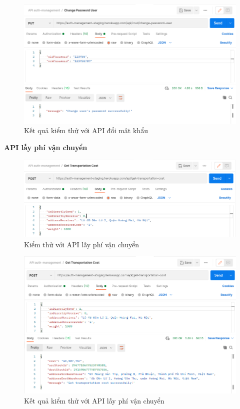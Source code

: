 		\begin{figure}[H]
			\includegraphics[width=1\textwidth]{Images/testing/API-change-password-result.png}
			\centering
			\linebreak
			\caption{Kết quả kiểm thử với API đổi mât khẩu}
		\end{figure}
		
		\newpage
		\textbf{API lấy phí vận chuyển}
		
		\begin{figure}[H]
			\includegraphics[width=1\textwidth]{Images/testing/API-get-cost.png}
			\centering
			\linebreak
			\caption{Kiểm thử với API lấy phí vận chuyển}
		\end{figure}
		
		\begin{figure}[H]
			\includegraphics[width=1\textwidth]{Images/testing/API-get-cost-result.png}
			\centering
			\linebreak
			\caption{Kết quả kiểm thử với API lấy phí vận chuyển}
		\end{figure}
		
